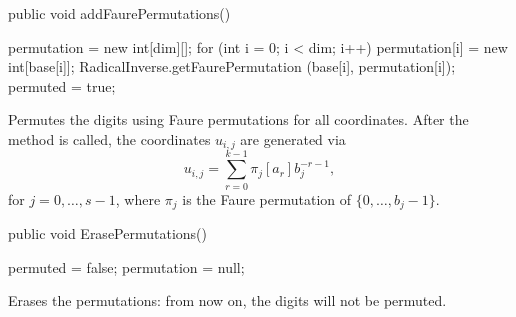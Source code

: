 \begin{code}

   public void addFaurePermutations()\begin{hide} {
      permutation = new int[dim][];
      for (int i = 0; i < dim; i++) {
         permutation[i] = new int[base[i]];
         RadicalInverse.getFaurePermutation (base[i], permutation[i]);
      }
      permuted = true;
   }
\end{hide}
\end{code}
 \begin{tabb}
  Permutes the digits using Faure permutations for all coordinates.
  After the method is called, the coordinates $u_{i,j}$ are generated via
\[
  u_{i,j} = \sum_{r=0}^{k-1} \pi_j[a_r] b_j^{-r-1},
\]
 for $j=0,\dots,s-1$,
 where $\pi_j$ is the Faure permutation of $\{0,\dots,b_j-1\}$.
 \end{tabb}
\begin{code}

   public void ErasePermutations()\begin{hide} {
      permuted = false;
      permutation = null;
   }
\end{hide}
\end{code}
 \begin{tabb}
  Erases the permutations: from now on, the digits will not be
  permuted.
 \end{tabb}
\begin{code}
\begin{hide}
    
   public int getNumPoints () {
      return Integer.MAX_VALUE;
   }

   public double getCoordinate (int i, int j) {
      if (radinv != null) {
         if (!permuted) {
            return radinv[j].nextRadicalInverse ();
         } else {
            throw new UnsupportedOperationException (
            "Fast radical inverse is not implemented in case of permutation");
         }
      } else {
         int k = start[j] + i;
         // if overflow, restart at first nonzero point
         // (Struckmeier restarts at zero)
         if (k < 0)
            k = (k & positiveBitMask) + 1;
         if (permuted)
            return RadicalInverse.permutedRadicalInverse 
            (base[j], permutation[j], k);
         else 
            return RadicalInverse.radicalInverse (base[j], k);
      }
   }
}
\end{hide}
\end{code}
